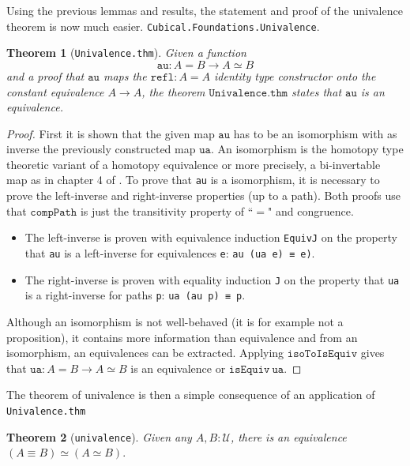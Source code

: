 \documentclass[12pt,a4paper,twoside,xetex]{book}
\newtheorem{theorem}{Theorem}[section]
\newcommand{\op}[1]{\mathtt{#1}}
\begin{document}
Using the previous lemmas and results, the statement and proof of the 
univalence theorem is now much easier. %
\texttt{Cubical.Foundations.Univalence}.

\begin{theorem}[\texttt{Univalence.thm}]
Given a function  $$\op{au} : A = B \rightarrow A \simeq B$$ and a proof that 
$\op{au}$ maps the $\op{refl} : A = A$ identity type constructor onto the 
constant equivalence $A \rightarrow A$, the theorem $\op{Univalence.thm}$ 
states that $\op{au}$ is an equivalence.
\end{theorem}

\begin{proof}
First it is shown that the given map $\op{au}$ has to be an isomorphism with as 
inverse the previously constructed map $\op{ua}$. An isomorphism is the 
homotopy type theoretic variant of a homotopy equivalence or more precisely, a 
bi-invertable map as in chapter 4 of \cite{Voevodsky2013}. To prove that 
\texttt{au} is a isomorphism, it is necessary to prove the left-inverse and 
right-inverse properties (up to a path). Both proofs use that $\op{compPath}$ 
is just the transitivity property of ``$=$" and congruence. 
\begin{itemize}
\item The left-inverse is proven with equivalence induction \texttt{EquivJ} on 
the property that \texttt{au} is a left-inverse for equivalences \texttt{e}: 
\texttt{au (ua e) ≡ e)}. 
\item The right-inverse is proven with equality induction \texttt{J} on the 
property that \texttt{ua} is a right-inverse for paths \texttt{p}: \texttt{ua 
(au p) ≡ p}. 
\end{itemize}
Although an isomorphism is not well-behaved (it is for example not a 
proposition), it contains more information than equivalence and from an 
isomorphism, an equivalences can be extracted. Applying $\op{isoToIsEquiv}$ 
gives that $\op{ua} : A = B \rightarrow A \simeq B$ is an equivalence or 
$\op{isEquiv}\ \op{ua}$. 
\end{proof}

The theorem of univalence is then a simple consequence of an application of 
\texttt{Univalence.thm}

\begin{theorem}[\texttt{univalence}]
Given any $A,B : \mathcal{U}$, there is an equivalence $\left( A \equiv B 
\right) \simeq \left( A \simeq B \right).$
\end{theorem}
\end{document}
